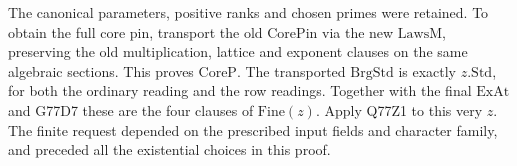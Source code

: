 The canonical parameters, positive ranks and chosen primes
were retained. To obtain the full core pin, transport the old
$\mathrm{CorePin}$ via the new $\mathrm{LawsM}$, preserving the
old multiplication, lattice and exponent clauses on the same
algebraic sections. This proves $\mathrm{CoreP}$. The transported
$\mathrm{BrgStd}$ is exactly $z.\mathrm{Std}$, for both the
ordinary reading and the row readings. Together with the final
$\mathrm{ExAt}$ and G77D7 these are the four clauses of
$\mathrm{Fine}(z)$. Apply Q77Z1 to this very $z$. The finite
request depended on the prescribed input fields and character
family, and preceded all the existential choices in this proof.
